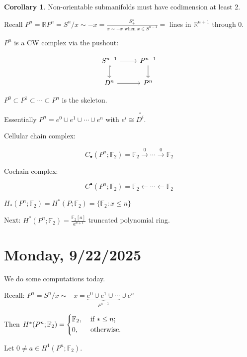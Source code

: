 \documentclass{article}
\theoremstyle{definition}
\newtheorem{corollary}[theorem]{Corollary}
\begin{document}
    \begin{corollary}
        Non-orientable submanifolds must have codimension at least \(2\).
    \end{corollary}

    Recall \(P^n = \mathbb{R} P^n = S^n / x \sim -x = \frac{S^n_+}{x \sim -x \text{ when } x \in S^{n-1}} =\) lines in \(\mathbb{R}^{n+1}\) through \(0\).
    
    \(P^n\) is a CW complex via the pushout:

    \[
        \begin{tikzcd}
            S^{n-1} \ar[r] \ar[d, hook] & P^{n-1} \ar[d] \\ D^n \ar[r] & P^n
        \end{tikzcd}
    \]

    \(P^0 \subset P^1 \subset \cdots \subset P^n\) is the skeleton.

    Essentially \(P^n = e^0 \cup e^1 \cup \cdots \cup e^n\) with \(e^i \cong \overset{\circ}{D^i}\).
    
    Cellular chain complex:

    \[
        C_\bullet(P^n; \mathbb{F}_2) = \mathbb{F}_2 \xrightarrow{0} \cdots \xrightarrow{0} \mathbb{F}_2
    \]

    Cochain complex:

    \[
        C^\bullet(P^n;\mathbb{F}_2) = \mathbb{F}_2 \leftarrow \cdots \leftarrow \mathbb{F}_2
    \]

    \(H_{\ast} (P^n;\mathbb{F}_2) = H^{\ast} (P;\mathbb{F}_2) = \{ \mathbb{F}_2: x \leq n \}\)

    Next: \(H^{\ast} (P^n;\mathbb{F}_2) = \frac{\mathbb{F}_2[a]}{a^{n+1}}\) truncated polynomial ring. 

    \section*{Monday, 9/22/2025}
    
    We do some computations today.

    Recall: \(P^n = S^n / x \sim -x = \underbrace{e^0 \cup e^1 \cup \cdots}_{P^{n-1} } \cup e^n\)

    Then \(H^{\ast} (P^n; \mathbb{F}_2) = \begin{dcases}
        \mathbb{F}_2, &\text{ if } \ast \leq n ;\\
        0, &\text{ otherwise} .
    \end{dcases}\) 

    Let \(0 \neq a \in H^1(P^n; \mathbb{F}_2)\).
\end{document}
